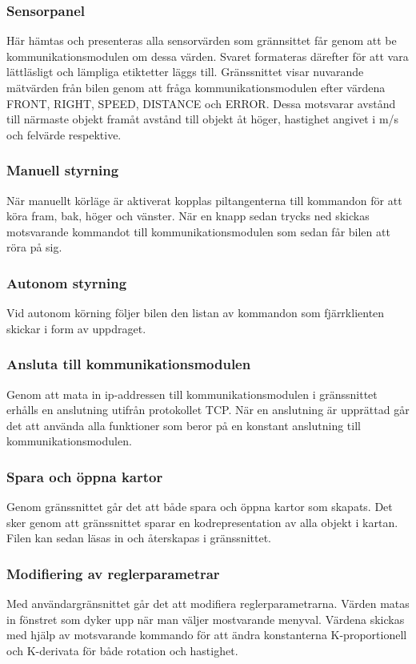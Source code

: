 \documentclass[tekniskrapport/tech.tex]{subfiles}
\begin{document}
\subsubsection{Sensorpanel}
Här hämtas och presenteras alla sensorvärden som grännsittet får genom att be
kommunikationsmodulen om dessa värden. Svaret formateras därefter för att vara
lättläsligt och lämpliga etiktetter läggs till. Gränssnittet visar nuvarande
mätvärden från bilen genom att fråga kommunikationsmodulen efter värdena FRONT,
RIGHT, SPEED, DISTANCE och ERROR. Dessa motsvarar avstånd till närmaste objekt
framåt avstånd till objekt åt höger, hastighet angivet i m/s och felvärde
respektive. 

\subsubsection{Manuell styrning}
När manuellt körläge är aktiverat kopplas piltangenterna till kommandon för att
köra fram, bak, höger och vänster. När en knapp sedan trycks ned skickas
motsvarande kommandot till kommunikationsmodulen som sedan får bilen att röra
på sig.

\subsubsection{Autonom styrning}
Vid autonom körning följer bilen den listan av kommandon som fjärrklienten
skickar i form av uppdraget.

\subsubsection{Ansluta till kommunikationsmodulen}
Genom att mata in ip-addressen till kommunikationsmodulen i gränssnittet erhålls
en anslutning utifrån protokollet TCP. När en anslutning är upprättad går det
att använda alla funktioner som beror på en konstant anslutning till
kommunikationsmodulen.

\subsubsection{Spara och öppna kartor}
Genom gränssnittet går det att både spara och öppna kartor som skapats. Det
sker genom att gränssnittet sparar en kodrepresentation av alla objekt i
kartan. Filen kan sedan läsas in och återskapas i gränssnittet.

\subsubsection{Modifiering av reglerparametrar}
Med användargränsnittet går det att modifiera reglerparametrarna. Värden matas
in fönstret som dyker upp när man väljer mostvarande menyval. Värdena skickas
med hjälp av motsvarande kommando för att ändra konstanterna K-proportionell
och K-derivata för både rotation och hastighet.
\end{document}
